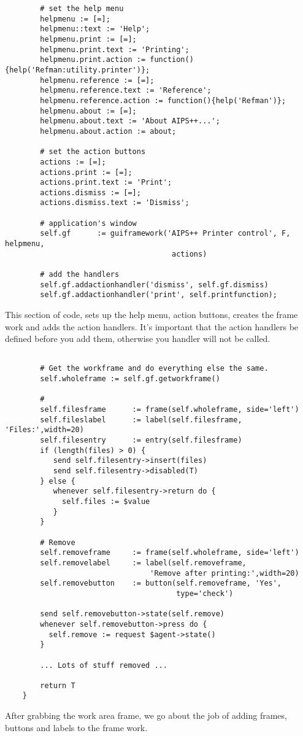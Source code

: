 \begin{verbatim}
        # set the help menu
        helpmenu := [=];
        helpmenu::text := 'Help';
        helpmenu.print := [=];
        helpmenu.print.text := 'Printing';
        helpmenu.print.action := function(){help('Refman:utility.printer')};
        helpmenu.reference := [=];
        helpmenu.reference.text := 'Reference';
        helpmenu.reference.action := function(){help('Refman')};
        helpmenu.about := [=];
        helpmenu.about.text := 'About AIPS++...';
        helpmenu.about.action := about;
 
        # set the action buttons
        actions := [=];
        actions.print := [=];
        actions.print.text := 'Print';
        actions.dismiss := [=];
        actions.dismiss.text := 'Dismiss';
 
        # application's window
        self.gf      := guiframework('AIPS++ Printer control', F, helpmenu,
                                      actions)
 
        # add the handlers
        self.gf.addactionhandler('dismiss', self.gf.dismiss)
        self.gf.addactionhandler('print', self.printfunction);

\end{verbatim}
This section of code, sets up the help menu, action buttons, creates the
frame work and adds the action handlers. It's important that the action 
handlers be defined before you add them, otherwise you handler will not be
called.

\begin{verbatim}

        # Get the workframe and do everything else the same.
        self.wholeframe := self.gf.getworkframe()
 
        #
        self.filesframe      := frame(self.wholeframe, side='left')
        self.fileslabel      := label(self.filesframe, 'Files:',width=20)
        self.filesentry      := entry(self.filesframe)
        if (length(files) > 0) {
           send self.filesentry->insert(files)
           send self.filesentry->disabled(T)
        } else {
           whenever self.filesentry->return do {
             self.files := $value
           }
        }
 
        # Remove
        self.removeframe     := frame(self.wholeframe, side='left')
        self.removelabel     := label(self.removeframe,
                                 'Remove after printing:',width=20)
        self.removebutton    := button(self.removeframe, 'Yes',
                                       type='check')
 
        send self.removebutton->state(self.remove)
        whenever self.removebutton->press do {
          self.remove := request $agent->state()
        }
 
        ... Lots of stuff removed ...

        return T
    }

\end{verbatim}
After grabbing the work area frame, we go about the job of adding frames, 
buttons and labels to the frame work.


